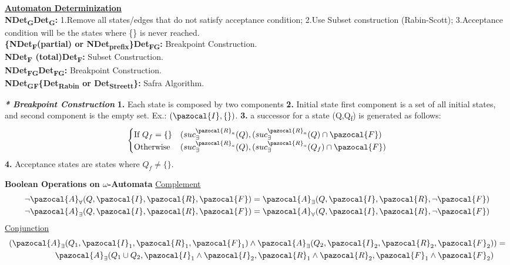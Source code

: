 \documentclass{article}
\newcommand{\Ib}{\pazocal{I}}
\newcommand{\Rb}{\pazocal{R}}
\newcommand{\Ab}{\pazocal{A}}
\newcommand{\Fb}{\pazocal{F}}
\begin{document}
\begin{multicols}{4}
\textbf{\underline{Automaton Determinization}}\\
\textbf{NDet\textsubscript{G}\textrightarrow Det\textsubscript{G}:} 
1.Remove all states/edges that do not satisfy acceptance condition;
2.Use Subset construction (Rabin-Scott);
3.Acceptance condition will be the states where \{\} is never reached. \\
\textbf{\{NDet\textsubscript{F}(partial) or NDet\textsubscript{prefix}\}\textrightarrow Det\textsubscript{FG}:} 
Breakpoint Construction. \\
\textbf{NDet\textsubscript{F} (total)\textrightarrow Det\textsubscript{F}:}
Subset Construction. \\
\textbf{NDet\textsubscript{FG}\textrightarrow Det\textsubscript{FG}:}
Breakpoint Construction.\\
\textbf{NDet\textsubscript{GF}\textrightarrow \{Det\textsubscript{Rabin} or Det\textsubscript{Streett}\}:}
Safra Algorithm.


\textbf{\textit{* Breakpoint Construction}}
\textbf{1.} Each state is composed by two components
\textbf{2.} Initial state first component is a set of all initial states, and second component is the empty set. Ex.: $(\Ib,\{\})$.
\textbf{3.} a successor for a state (Q,Q\textsubscript{f}) is generated as follows:
\begin{align*}
\begin{cases}
\text{If }Q_f = \{\} & (suc^{\Rb_{a}}_{\exists}(Q), (suc^{\Rb_{a}}_{\exists}(Q) \cap \Fb) \\
\text{Otherwise} & (suc^{\Rb_{a}}_{\exists}(Q), (suc^{\Rb_{a}}_{\exists}(Q_f) \cap \Fb) \\
\end{cases}
\end{align*}
\textbf{4.} Acceptance states are states where $Q_f \neq \{\}$.

\textbf{Boolean Operations on $\omega$-Automata}
\underline{Complement}
\begin{align*}
\neg \Ab_{\forall}(Q,\Ib,\Rb,\Fb)=\Ab_{\exists}(Q,\Ib,\Rb,\neg \Fb) \\
\neg \Ab_{\exists}(Q,\Ib,\Rb,\Fb)=\Ab_{\forall}(Q,\Ib,\Rb,\neg \Fb)
\end{align*}
\underline{Conjunction}
\begin{align*}
(\Ab_{\exists}(Q_1,\Ib_1,\Rb_1,\Fb_1)\wedge \Ab_{\exists}(Q_2,\Ib_2,\Rb_2,\Fb_2)&)=\\
\Ab_{\exists}(Q_1 \cup Q_2,\Ib_1 \wedge \Ib_2,\Rb_1 \wedge \Rb_2,\Fb_1 \wedge \Fb_2)&
\end{align*}


\end{multicols}
\end{document}
